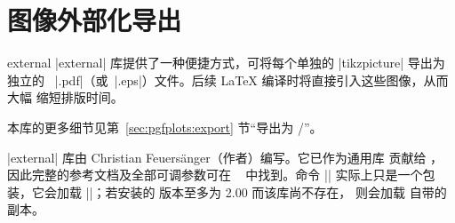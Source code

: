 
\section{图像外部化导出}

\begingroup
\def\pgfplotsmanualcurlibrary{external}

\begin{pgfplotslibrary}{external}
    |external| 库提供了一种便捷方式，可将每个单独的 |tikzpicture| 导出为独立的
    ~|.pdf|（或~|.eps|）文件。后续 \LaTeX{} 编译时将直接引入这些图像，从而大幅
    缩短排版时间。

    本库的更多细节见第~\ref{sec:pgfplots:export} 节“导出为 {\pdf/\eps}”。

    |external| 库由 Christian Feuersänger（\PGFPlots 作者）编写。它已作为通用库
    贡献给 \Tikz{}，因此完整的参考文档及全部可调参数可在
    ~\cite[第 ``Externalization Library'' 节]{tikz} 中找到。命令
    || 实际上只是一个包装，它会加载
    |\usetikzlibrary{external}|；若安装的 \pgfname{} 版本至多为 2.00 而该库尚不存在，
    则会加载 \PGFPlots{} 自带的副本。
\end{pgfplotslibrary}
\endgroup

